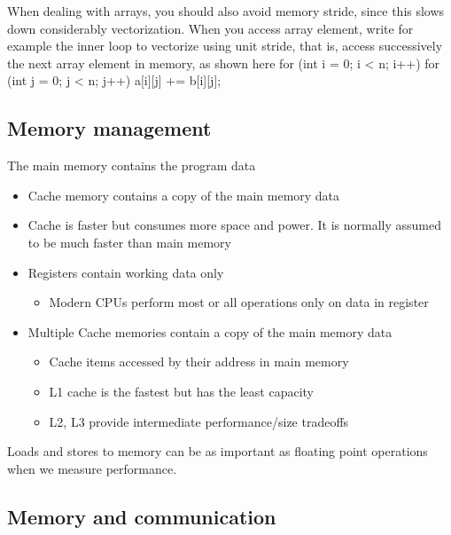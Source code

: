 \documentclass[%
oneside,                 %
final,                   %
10pt]{article}
\begin{document}
When dealing with arrays, you should also avoid memory stride, since this slows down considerably vectorization. When you access array element, write for example the inner loop to vectorize using unit stride, that is, access successively the next array element in memory, as shown here
\bcppcod
  for (int i = 0; i < n; i++) {
      for (int j = 0; j < n; j++) {
           a[i][j] += b[i][j];
      }  
  }
\ecppcod


\subsection{Memory management}
The main memory contains the program data
\begin{itemize}
\item Cache memory contains a copy of the main memory data

\item Cache is faster but consumes more space and power. It is normally assumed to be much faster than main memory

\item Registers contain working data only
\begin{itemize}

 \item Modern CPUs perform most or all operations only on data in register

\end{itemize}

\noindent
\item Multiple Cache memories contain a copy of the main memory data
\begin{itemize}

 \item Cache items accessed by their address in main memory

 \item L1 cache is the fastest but has the least capacity

 \item L2, L3 provide intermediate performance/size tradeoffs
\end{itemize}

\noindent
\end{itemize}

\noindent
Loads and stores to memory can be as important as floating point operations when we measure performance.


\subsection{Memory and communication}
\end{document}
